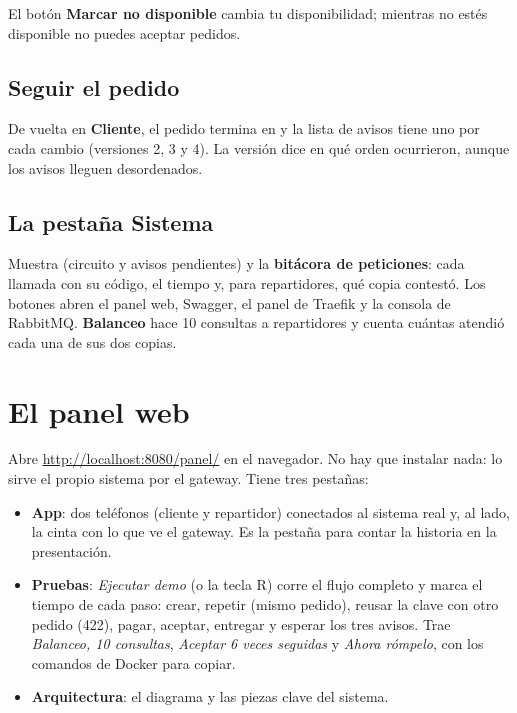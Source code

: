 \documentclass[11pt]{article}
\begin{document}
El botón \textbf{Marcar no disponible} cambia tu disponibilidad; mientras no estés disponible no puedes
aceptar pedidos.

\subsection{Seguir el pedido}
De vuelta en \textbf{Cliente}, el pedido termina en  y la lista de avisos tiene uno por
cada cambio (versiones 2, 3 y 4). La versión dice en qué orden ocurrieron, aunque los avisos lleguen
desordenados.

\subsection{La pestaña Sistema}
Muestra  (circuito y avisos pendientes) y la \textbf{bitácora de peticiones}: cada
llamada con su código, el tiempo y, para repartidores, qué copia contestó. Los botones abren el panel web,
Swagger, el panel de Traefik y la consola de RabbitMQ. \textbf{Balanceo} hace 10 consultas a repartidores
y cuenta cuántas atendió cada una de sus dos copias.

\section{El panel web}

Abre \url{http://localhost:8080/panel/} en el navegador. No hay que instalar nada: lo sirve el propio
sistema por el gateway. Tiene tres pestañas:

\begin{itemize}
  \item \textbf{App}: dos teléfonos (cliente y repartidor) conectados al sistema real y, al lado, la cinta
        con lo que ve el gateway. Es la pestaña para contar la historia en la presentación.
  \item \textbf{Pruebas}: \emph{Ejecutar demo} (o la tecla R) corre el flujo completo y marca el tiempo de
        cada paso: crear, repetir (mismo pedido), reusar la clave con otro pedido (422), pagar, aceptar,
        entregar y esperar los tres avisos. Trae \emph{Balanceo, 10 consultas}, \emph{Aceptar 6 veces
        seguidas} y \emph{Ahora rómpelo}, con los comandos de Docker para copiar.
  \item \textbf{Arquitectura}: el diagrama y las piezas clave del sistema.
\end{itemize}
\end{document}
